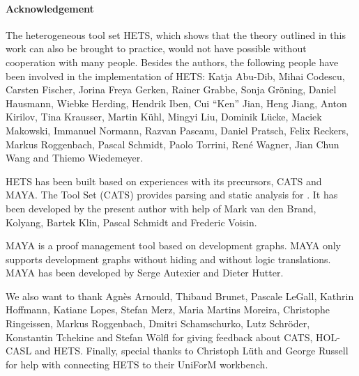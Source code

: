 \documentclass{article}
\newcommand{\normalTEXTSC}[2]{{#1\scriptsize#2}}
\newcommand     {\MAYA}{\normalTEXTSC{M}{AYA}\xspace}
\newcommand     {\Hets}{\normalTEXTSC{H}{ETS}\xspace}
\newcommand     {\Cats}{\normalTEXTSC{C}{ATS}\xspace}
\begin{document}
\paragraph{Acknowledgement}
The heterogeneous tool set \Hets, which shows that the theory outlined
in this work can also be brought to practice, would not have possible
without cooperation with many people.
Besides the authors, the following people have been involved
in the implementation of \Hets:
Katja Abu-Dib,
Mihai Codescu,
Carsten Fischer,
Jorina Freya Gerken,
Rainer Grabbe,
Sonja Gr\"{o}ning,
Daniel Hausmann,
Wiebke Herding,
Hendrik Iben,
Cui ``Ken'' Jian,
Heng Jiang,
Anton Kirilov,
Tina Krausser,
Martin K\"{u}hl,
Mingyi Liu,
Dominik L\"{u}cke,
Maciek Makowski,
Immanuel Normann,
Razvan Pascanu,
Daniel Pratsch,
Felix Reckers,
Markus Roggenbach, 
Pascal Schmidt, 
Paolo Torrini,
Ren\'{e} Wagner,
Jian Chun Wang and
Thiemo Wiedemeyer.

\Hets has been built based on experiences with its
precursors, 
                \index{Cats@\Cats}%
\Cats and 
                \index{Maya@\MAYA}%
\MAYA.
The \CASL Tool Set (\Cats) 
\cite{Mossakowski:2000:CST,Mossakowski:1998:SSA}
provides parsing and static analysis for \CASL.
It has been developed by the present author with help
of Mark van den Brand, Kolyang, Bartek Klin, Pascal Schmidt and 
Frederic Voisin.

\MAYA \cite{Autexier:2002:IHD,AutexierEtal02} is a proof management
tool based on development graphs.  \MAYA only supports development
graphs without hiding and without logic translations.  \MAYA has been
developed by Serge Autexier and Dieter Hutter.

We also want to thank Agn\`es Arnould, Thibaud Brunet, Pascale LeGall,
Kathrin Hoffmann, Katiane Lopes, 
Stefan Merz, Maria Martins Moreira, Christophe 
Ringeissen, Markus Roggenbach, Dmitri Schamschurko, Lutz Schr\"oder,
Konstantin Tchekine and Stefan W\"olfl 
for giving feedback about \Cats, HOL-CASL and \Hets. Finally,
special thanks to Christoph L\"uth and George Russell
for help with connecting \Hets to their UniForM workbench.




\end{document}
